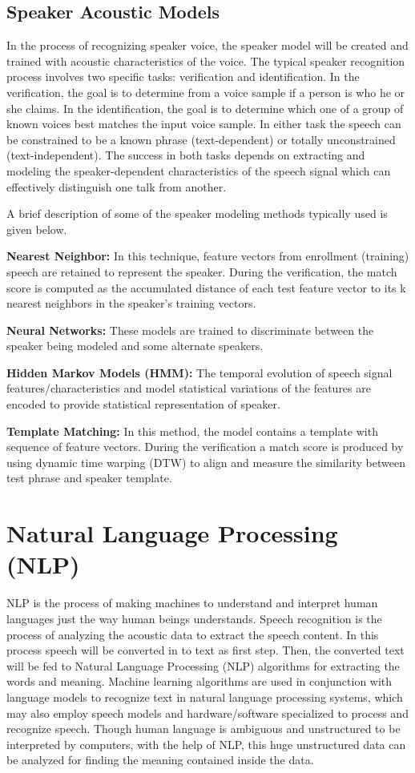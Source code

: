 \documentclass[sigconf]{acmart}
\begin{document}
\subsection{Speaker Acoustic Models}
In the process of recognizing speaker voice, the speaker model will be created and trained with acoustic characteristics of the voice. The typical speaker recognition process involves two specific tasks: verification and identification. In the verification, the goal is to determine from a voice sample if a person is who he or she claims. In the identification, the goal is to determine which one of a group of known voices best matches the input voice sample. In either task the speech can be constrained to be a known phrase (text-dependent) or totally unconstrained (text-independent). The success in both tasks depends on extracting and modeling the speaker-dependent characteristics of the speech signal which can effectively distinguish one talk from another.

A brief description of some of the speaker modeling methods typically used is given below.
\par\null\par
\textbf{Nearest Neighbor:} In this technique, feature vectors from enrollment (training) speech are retained to represent the speaker. During the verification, the match score is computed as the accumulated distance of each test feature vector to its k nearest neighbors in the speaker's training vectors.

\textbf{Neural Networks:} These models are trained to discriminate between the speaker being modeled and some alternate speakers.

\textbf{Hidden Markov Models (HMM):}  The temporal evolution of speech signal
features/characteristics and model statistical variations of the features are encoded to provide statistical representation of speaker.

\textbf{Template Matching:} In this method, the model contains a template with sequence of feature vectors. During the verification a match score is produced by using dynamic time warping (DTW) to align and measure the similarity between test phrase and speaker template.

\section{Natural Language Processing (NLP)} 
NLP is the process of making machines to understand and interpret human languages just the way human beings understands. Speech recognition is the process of analyzing the acoustic data to extract the speech content. In this process speech will be converted in to text as first step. Then, the converted text will be fed to Natural Language Processing (NLP) algorithms for extracting the words and meaning. Machine learning algorithms are used in conjunction with language models to recognize text in natural language processing systems, which may also employ speech models and hardware/software specialized to process and recognize speech. Though human language is ambiguous and unstructured to be interpreted by computers, with the help of NLP, this huge unstructured data can be analyzed for finding the meaning contained inside the data. 
\end{document}

